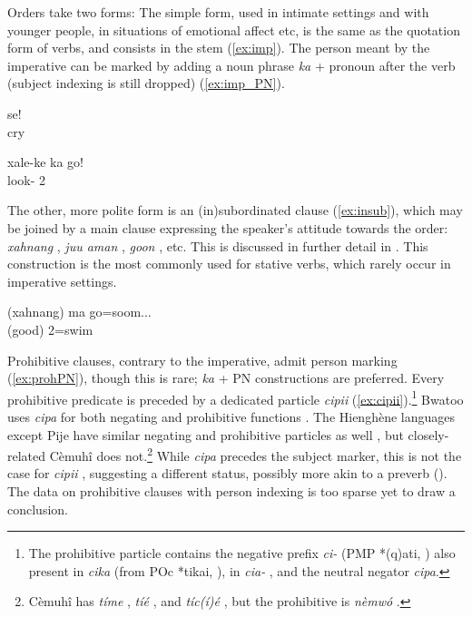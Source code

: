 Orders take two forms: The simple form, used in intimate settings and with younger people, in situations of emotional affect etc, is the same as the quotation form of verbs, and consists in the stem (\ref{ex:imp}). The person meant by the imperative can be marked by adding a noun phrase \textit{ka}  + pronoun after the verb (subject indexing is still dropped) (\ref{ex:imp_PN}).



\ea\label{ex:imp}
\gll se!\\
 cry\\
\glt {}
 \z

\ea\label{ex:imp_PN}
\gll xale-ke ka go!\\
 look-  2\\
\glt {}
\z


The other, more polite form is an (in)subordinated clause (\ref{ex:insub}), which may be joined by a main clause expressing the speaker's attitude towards the order: \textit{xahnang} , \textit{juu aman} , \textit{goon} , etc. This is discussed in further detail in . This construction is the most commonly used for stative verbs, which rarely occur in imperative settings.

\ea \label{ex:insub}
\gll (xahnang) ma go=soom...\\
 (good)  2=swim\\
\glt {}
\z

Prohibitive clauses, contrary to the imperative, admit person marking (\ref{ex:prohPN}), though this is rare; \textit{ka} + PN constructions are preferred. Every prohibitive predicate is preceded by a dedicated particle \textit{cipii} (\ref{ex:cipii}).\footnote{The prohibitive particle contains the negative prefix \textit{ci-} (PMP *(q)ati,  \citealt[88]{lynch_oceanic_2002}) also present in \textit{cika}  (from POc *tikai, \citealt[88]{lynch_oceanic_2002}), in \textit{cia-} , and the neutral negator \textit{cipa}.} Bwatoo uses \textit{cipa} for both negating and prohibitive functions \parencite[58]{rivierre_bwatoo_2006}. %
The Hienghène languages except Pije have similar negating and prohibitive particles as well \parencite[250]{haudricourt_dictionnaire_1982}, but closely-related Cèmuhî does not.\footnote{Cèmuhî has \textit{tíme}  \parencite[184]{rivierre_langue_1980}, \textit{tíé}  \parencite[111]{rivierre_langue_1980}, and \textit{tíc(í)é}  \parencite[302]{rivierre_langue_1980}, but the prohibitive is \textit{nèmwó} \parencite[223]{rivierre_langue_1980}.} While \textit{cipa}  precedes the subject marker, this is not the case for \textit{cipii} , suggesting a different status, possibly more akin to a preverb (). The data on prohibitive clauses with person indexing is too sparse yet to draw a conclusion.


